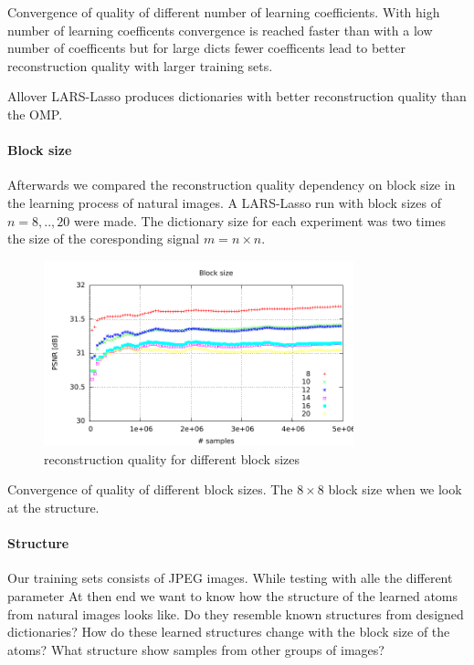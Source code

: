 Convergence of quality of different number of learning coefficients.
With high number of learning coefficents convergence is reached faster than
with a low number of coefficents but for large dicts fewer coefficents lead to
better reconstruction quality with larger training sets.

Allover LARS-Lasso produces dictionaries with better reconstruction quality
than the OMP. 

\paragraph{Block size}
Afterwards we compared the reconstruction quality dependency on block size in
the learning process of natural images. A LARS-Lasso run with block sizes of
$n=8,..,20$ were made. The dictionary size for each experiment was two times the
size of the coresponding signal $m=n\times n$. 

\begin{figure}[h]
\centering
\includegraphics[width =
0.8\textwidth]{../tests/results/blockSizeConverg.pdf}
\caption{reconstruction quality for different block sizes}
\label{fig:dict size}
\end{figure}

Convergence of quality of different block sizes.
The $8\times8$ block size when we look at the structure.

\paragraph{Structure}
Our training sets consists of JPEG images.
While testing with alle the different parameter
At then end we want to know how the structure of the learned atoms from natural
images looks like. Do they resemble known structures from designed dictionaries?
How do these learned structures change with the block size of the atoms?
What structure show samples from other groups of images?

